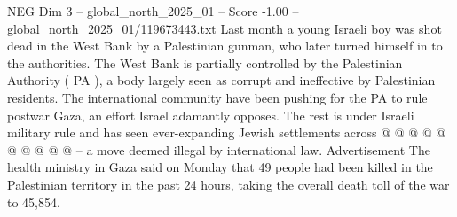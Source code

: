\begin{textsample}{NEG Dim 3 – global\_north\_2025\_01 – Score -1.00 – global\_north\_2025\_01/119673443.txt}
Last month a young Israeli boy was shot dead in the West Bank by a Palestinian gunman, who later turned himself in to the authorities.
The West Bank is partially controlled by the Palestinian Authority ( PA ), a body largely seen as corrupt and ineffective by Palestinian residents.
The international community have been pushing for the PA to rule postwar Gaza, an effort Israel adamantly opposes.
The rest is under Israeli military rule and has seen ever-expanding Jewish settlements across @ @ @ @ @ @ @ @ @ @ -- a move deemed illegal by international law.
Advertisement The health ministry in Gaza said on Monday that 49 people had been killed in the Palestinian territory in the past 24 hours, taking the overall death toll of the war to 45,854.

\end{textsample}

